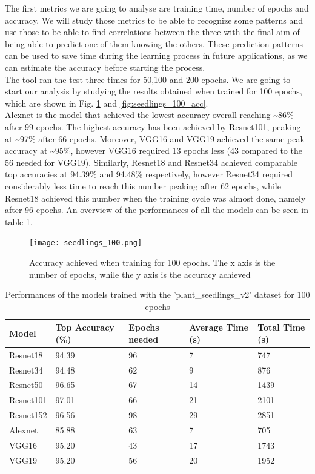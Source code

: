 The first metrics we are going to analyse are training time, number of epochs and accuracy. We will study those metrics to be able to recognize some patterns and use those to be able to find correlations between the three with the final aim of being able to predict one of them knowing the others. These prediction patterns can be used to save time during the learning process in future applications, as we can estimate the accuracy before starting the process.  \\
The tool ran the test three times for 50,100 and 200 epochs. 
We are going to start our analysis by studying the results obtained when trained for 100 epochs, which are shown in Fig. \ref{fig:seedlings_100_epoch_accuracy} and \ref{fig:seedlings_100_acc}. \\
Alexnet is the model that achieved the lowest accuracy overall reaching \textasciitilde86\% after 99 epochs. The highest accuracy has been achieved by Resnet101, peaking at \textasciitilde97\% after 66 epochs. Moreover, VGG16 and VGG19 achieved the same peak accuracy at \textasciitilde95\%, however VGG16 required 13 epochs less (43 compared to the 56 needed for VGG19). Similarly, Resnet18 and Resnet34 achieved comparable top accuracies at  94.39\% and 94.48\% respectively, however Resnet34 required considerably less time to reach this number peaking after 62 epochs, while Resnet18 achieved this number when the training cycle was almost done, namely after 96 epochs. An overview of the performances of all the models can be seen in table \ref{tab:performances_seeds}. 

\begin{figure}[h]
       \centering 
	    \texttt{[image: seedlings\_100.png]}
        \caption[Accuracy achieved when training for 100 epochs]{Accuracy achieved when training for 100 epochs. The x axis is the number of epochs, while the y axis is the accuracy achieved}
         \label{fig:seedlings_100_epoch_accuracy}
\end{figure}


\begin{table}[htbp]
\centering
\begin{tabular}{ p{2cm} p{4cm} p{3cm} p{3cm} p{2cm}  }
 Model& Top Accuracy (\%) & Epochs needed &Average Time (s)&Total Time (s)\\
 \hline
Resnet18&94.39&96&7&747\\
Resnet34&94.48&62&9&876\\
Resnet50&96.65&67&14&1439\\
Resnet101&97.01&66&21&2101\\
Resnet152&96.56&98&29&2851\\
Alexnet&85.88&63&7&705\\
VGG16&95.20&43&17&1743\\
VGG19&95.20&56&20&1952\\
 \hline
\end{tabular}
\caption{Performances of the models trained with the 'plant\_seedlings\_v2' dataset for 100 epochs}
\label{tab:performances_seeds}
\end{table}


